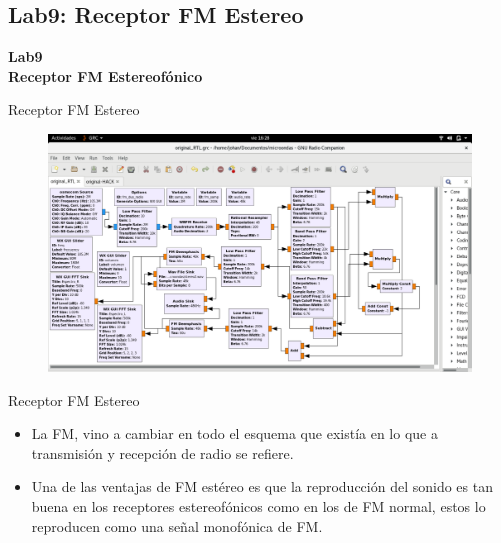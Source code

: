 \subsection{Lab9: Receptor FM Estereo}
\begin{frame}{}


\bfseries{\textrm{\LARGE Lab9\\ \Large Receptor FM Estereofónico}}
\raggedright
\end{frame}

\begin{frame}{Receptor FM Estereo}


\begin{figure}[H]
\centering
\vspace{-3mm}
\includegraphics[width=\textwidth]{parte3/lab9/pdf/lab9_1.pdf}
\end{figure}

\end{frame}

\begin{frame}{Receptor FM Estereo}

\begin{itemize}
    \item {La FM, vino a cambiar en todo el esquema que existía en lo que a transmisión y recepción de radio se refiere.}
    \item {Una de las ventajas de FM estéreo es que la reproducción del sonido es tan buena en los receptores estereofónicos como en los de FM normal, estos lo reproducen como una señal monofónica de FM.}
\end{itemize}

\end{frame}

